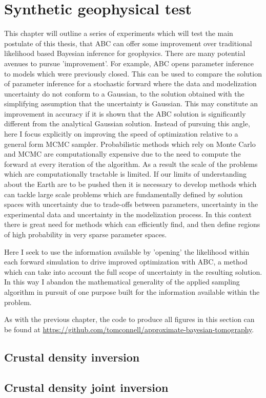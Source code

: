 \chapter{Synthetic geophysical test}

This chapter will outline a series of experiments which will test the main postulate of this thesis, that ABC can offer some improvement over traditional likelihood based Bayesian inference for geophysics. There are many potential avenues to pursue 'improvement'. For example, ABC opens parameter inference to models which were previously closed. This can be used to compare the solution of parameter inference for a stochastic forward where the data and modelization uncertainty do not conform to a Gaussian, to the solution obtained with the simplifying assumption that the uncertainty is Gaussian. This may constitute an improvement in accuracy if it is shown that the ABC solution is significantly different from the analytical Gaussian solution. Instead of pursuing this angle, here I focus explicitly on improving the speed of optimization relative to a general form MCMC sampler. Probabilistic methods which rely on Monte Carlo and MCMC are computationally expensive due to the need to compute the forward at every iteration of the algorithm. As a result the scale of the problems which are computationally tractable is limited. If our limits of understanding about the Earth are to be pushed then it is necessary to develop methods which can tackle large scale problems which are fundamentally defined by solution spaces with uncertainty due to trade-offs between parameters, uncertainty in the experimental data and uncertainty in the modelization process. In this context there is great need for methods which can efficiently find, and then define regions of high probability in very sparse parameter spaces. \par

Here I seek to use the information available by 'opening' the likelihood within each forward simulation to drive improved optimization with ABC, a method which can take into account the full scope of uncertainty in the resulting solution. In this way I abandon the mathematical generality of the applied sampling algorithm in pursuit of one purpose built for the information available within the problem. \par

As with the previous chapter, the code to produce all figures in this section can be found at \url{https://github.com/tomconnell/approximate-bayesian-tomography}.\par


\section{Crustal density inversion}



\section{Crustal density joint inversion}
